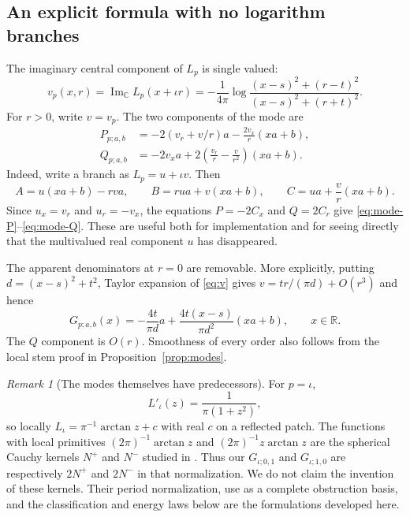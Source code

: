 \documentclass[11pt,a4paper]{article}
\numberwithin{equation}{section}
\theoremstyle{definition}
\theoremstyle{remark}
\newtheorem{remark}[theorem]{Remark}
\newcommand{\R}{\mathbb R}
\newcommand{\C}{\mathbb C}
\newcommand{\ImC}{\operatorname{Im}_{\C}}
\begin{document}
\subsection{An explicit formula with no logarithm branches}
The imaginary central component of $L_p$ is single valued:
\begin{equation}
 v_p(x,r)=\ImC L_p(x+\iota r)
 =-\frac1{4\pi}\log
   \frac{(x-s)^2+(r-t)^2}{(x-s)^2+(r+t)^2}.\label{eq:v}
\end{equation}
For $r>0$, write $v=v_p$. The two components of the mode are
\begin{align}
 P_{p;a,b}&=-2(v_r+v/r)a-\frac{2v_x}{r}(xa+b),\label{eq:mode-P}\\
 Q_{p;a,b}&=-2v_xa+2\left(\frac{v_r}{r}-\frac{v}{r^2}\right)(xa+b).
 \label{eq:mode-Q}
\end{align}
Indeed, write a branch as $L_p=u+\iota v$. Then
\[
 A=u(xa+b)-rv a,\qquad B=rua+v(xa+b),
 \qquad C=u a+\frac vr(xa+b).
\]
Since $u_x=v_r$ and $u_r=-v_x$, the equations $P=-2C_x$ and $Q=2C_r$
give \eqref{eq:mode-P}--\eqref{eq:mode-Q}.
These are useful both for implementation and for seeing directly that the
multivalued real component $u$ has disappeared.

The apparent denominators at $r=0$ are removable. More explicitly, putting
$d=(x-s)^2+t^2$, Taylor expansion of \eqref{eq:v} gives
$v=t r/(\pi d)+O(r^3)$ and hence
\begin{equation}
 G_{p;a,b}(x)=-\frac{4t}{\pi d}a
       +\frac{4t(x-s)}{\pi d^2}(xa+b),\qquad x\in\R.
 \label{eq:mode-real}
\end{equation}
The $Q$ component is $O(r)$. Smoothness of every order also follows from
the local stem proof in Proposition~\ref{prop:modes}.

\begin{remark}[The modes themselves have predecessors]\label{rem:known-modes}
For $p=\iota$,
\[
 L'_\iota(z)=\frac1{\pi(1+z^2)},
\]
so locally $L_\iota=\pi^{-1}\arctan z+c$ with real $c$ on a reflected
patch. The functions with local primitives
$(2\pi)^{-1}\arctan z$ and $(2\pi)^{-1}z\arctan z$ are the spherical
Cauchy kernels $N^+$ and $N^-$ studied in
\cite[Example~2]{CPSS}. Thus our $G_{\iota;0,1}$ and
$G_{\iota;1,0}$ are respectively $2N^+$ and $2N^-$ in that
normalization. We do not claim the invention of these kernels. Their
period normalization, use as a complete obstruction basis, and the
classification and energy laws below are the formulations developed here.
\end{remark}
\end{document}
